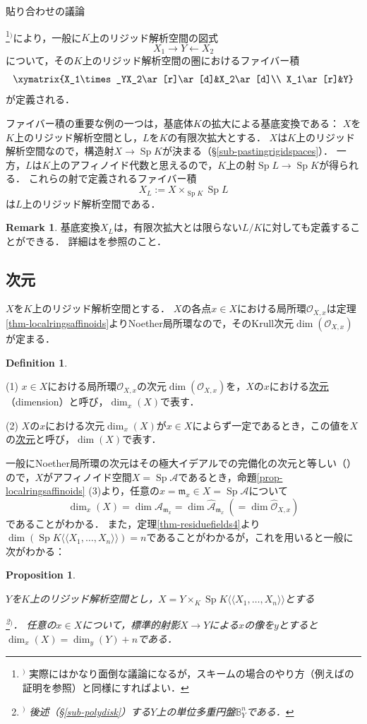 \documentclass[a4paper,12pt, dvipdfmx]{jsbook}
\def\B{\mathbb{B}}
\def\O{\mathscr{O}}
\def\m{\mathfrak{m}}
\def\Sp{\mathop{\mathrm{Sp}}\nolimits}
\def\dl{\langle\!\langle}
\def\dr{\rangle\!\rangle}
\theoremstyle{plain}
\newtheorem{prop}[thm]{\bfseries Proposition}
\theoremstyle{definition}
\newtheorem{rem}[thm]{\bfseries Remark}
\newtheorem{dfn}[thm]{\bfseries Definition}
\newcounter{chushaku}
\def\chu#1{\addtocounter{chushaku}{1}\footnote[\value{chushaku}]{${}^)$ #1}${}^)$}
\begin{document}
貼り合わせの議論\chu{実際にはかなり面倒な議論になるが，スキームの場合のやり方（例えば\cite[Chap.\ II, Theorem 3.3]{Hart2}の証明を参照）と同様にすればよい．}により，一般に$K$上のリジッド解析空間の図式
$$
X_1\longrightarrow Y\longleftarrow X_2
$$
について，その$K$上のリジッド解析空間の圏におけるファイバー積
$$
\xymatrix{X_1\times_YX_2\ar[r]\ar[d]&X_2\ar[d]\\ X_1\ar[r]&Y}
$$
が定義される．

ファイバー積の重要な例の一つは，基底体$K$の拡大による基底変換である：
$X$を$K$上のリジッド解析空間とし，$L$を$K$の有限次拡大とする．
$X$は$K$上のリジッド解析空間なので，構造射$X\rightarrow\Sp K$が決まる（\S\ref{sub-pastingrigidspaces}）．
一方，$L$は$K$上のアフィノイド代数と思えるので，$K$上の射$\Sp L\rightarrow\Sp K$が得られる．
これらの射で定義されるファイバー積
$$
X_L:=X\times_{\Sp K}\Sp L
$$
は$L$上のリジッド解析空間である．

\begin{rem}\label{rem-baseextensiongeneral}{\rm 
基底変換$X_L$は，有限次拡大とは限らない$L/K$に対しても定義することができる．
詳細は\cite[\S9.3.6]{BGR}を参照のこと．}
\end{rem}

\subsection{次元}\label{sub-dimension}
$X$を$K$上のリジッド解析空間とする．
$X$の各点$x\in X$における局所環$\O_{X,x}$は定理\ref{thm-localringsaffinoids}よりNoether局所環なので，そのKrull次元$\dim(\O_{X,x})$が定まる．

\begin{dfn}\label{dfn-dimension}{\rm 
(1) $x\in X$における局所環$\O_{X,x}$の次元$\dim(\O_{X,x})$を，$X$の$x$における\underline{次元}（dimension）と呼び，$\dim_x(X)$で表す．

(2) $X$の$x$における次元$\dim_x(X)$が$x\in X$によらず一定であるとき，この値を$X$の\underline{次元}と呼び，$\dim(X)$で表す．}
\end{dfn}

一般にNoether局所環の次元はその極大イデアルでの完備化の次元と等しい（\cite[Cor.\ 11.19]{AM}）ので，$X$がアフィノイド空間$X=\Sp\mathcal{A}$であるとき，命題\ref{prop-localringsaffinoids} (3)より，任意の$x=\m_x\in X=\Sp\mathcal{A}$について
$$
\dim_x(X)=\dim\mathcal{A}_{\m_x}=\dim\widehat{\mathcal{A}}_{\m_x}\ (=\dim\widehat{\O}_{X,x})
$$
であることがわかる．
また，定理\ref{thm-residuefields4}より$\dim(\Sp K\dl X_1,\ldots,X_n\dr)=n$であることがわかるが，これを用いると一般に次がわかる：
\begin{prop}\label{prop-dimensiontate}{\rm 
$Y$を$K$上のリジッド解析空間とし，$X=Y\times_K\Sp K\dl X_1,\ldots,X_n\dr$とする\chu{後述（\S\ref{sub-polydisk}）する$Y$上の単位多重円盤$\B^n_Y$である．}．
任意の$x\in X$について，標準的射影$X\rightarrow Y$による$x$の像を$y$とすると$\dim_x(X)=\dim_y(Y)+n$である．}
\end{prop}
\end{document}
